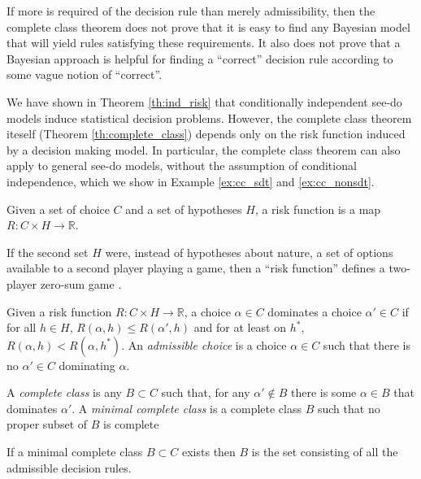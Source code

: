If more is required of the decision rule than merely admissibility, then the complete class theorem does not prove that it is easy to find any Bayesian model that will yield rules satisfying these requirements. It also does not prove that a Bayesian approach is helpful for finding a ``correct'' decision rule according to some vague notion of ``correct''.

We have shown in Theorem \ref{th:ind_risk} that conditionally independent see-do models induce statistical decision problems. However, the complete class theorem iteself (Theorem \ref{th:complete_class}) depends only on the risk function induced by a decision making model. In particular, the complete class theorem can also apply to general see-do models, without the assumption of conditional independence, which we show in Example \ref{ex:cc_sdt} and \ref{ex:cc_nonsdt}.

\begin{definition}
Given a set of choice $C$ and a set of hypotheses $H$, a risk function is a map $R:C\times H\to \mathbb{R}$.
\end{definition}

If the second set $H$ were, instead of hypotheses about nature, a set of options available to a second player playing a game, then a ``risk function'' defines a two-player zero-sum game \citet{toutenburg_ferguson_1967}.

\begin{definition}\label{def:admissible_decision}
Given a risk function $R:C\times H\to \mathbb{R}$, a choice $\alpha\in C$ dominates a choice $\alpha'\in C$ if for all $h\in H$, $R(\alpha,h)\leq R(\alpha',h)$ and for at least on $h^*$, $R(\alpha,h)<R(\alpha,h^*)$. An \emph{admissible choice} is a choice $\alpha\in C$ such that there is no $\alpha'\in C$ dominating $\alpha$.
\end{definition}

\begin{definition}\label{th:complete_class}
A \emph{complete class} is any $B\subset C$ such that, for any $\alpha'\not \in B$ there is some $\alpha\in B$ that dominates $\alpha'$. A \emph{minimal complete class} is a complete class $B$ such that no proper subset of $B$ is complete
\end{definition}

\begin{theorem}
If a minimal complete class $B\subset C$ exists then $B$ is the set consisting of all the admissible decision rules.
\end{theorem}

